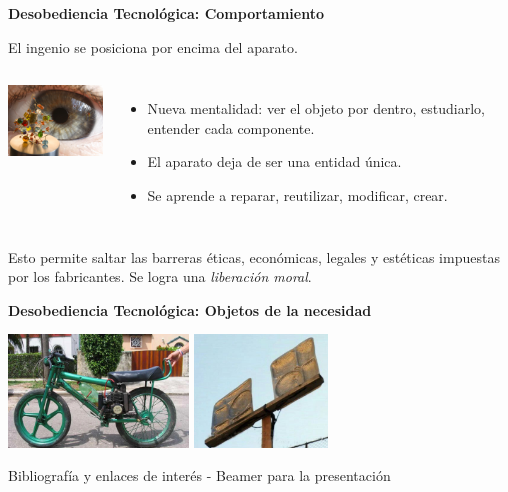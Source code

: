 \documentclass[spanish]{beamer}
\begin{document}
\begin{frame}{\bf{Desobediencia Tecnológica}: Comportamiento}        
    
    El ingenio se posiciona por encima del aparato.
    \vspace{0.3cm}
    \begin{columns}
            \centering
            \includegraphics[width=3.5cm]{img/complejidad.jpg}
            \begin{itemize}
                \item Nueva mentalidad: ver el objeto por dentro, estudiarlo, entender cada componente.
                \item El aparato deja de ser una entidad única.
                \item Se aprende a reparar, reutilizar, modificar, crear.
            \end{itemize}
    \end{columns}
    \vspace{0.3cm}
    Esto permite saltar las barreras éticas, económicas, legales y estéticas impuestas por los fabricantes.
    Se logra una \emph{liberación moral}.
\end{frame}

\begin{frame}{\bf{Desobediencia Tecnológica}: Objetos de la necesidad}
    \begin{center}            
        \includegraphics[height=3cm]{img/inventos/rikimbili.jpg}
        \includegraphics[height=3cm]{img/inventos/antena_bandejas.jpg}
    \end{center}
\end{frame}

\begin{frame}{Bibliografía y enlaces de interés}
    - Beamer para la presentación

    
\end{frame}
\end{document}
